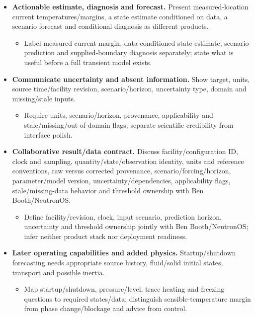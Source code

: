 \begin{itemize}[leftmargin=*]
\item {}\textbf{Actionable estimate, diagnosis and forecast.} Present measured-location current temperatures/\allowbreak{}margins, a state estimate conditioned on data, a scenario forecast and conditional diagnosis as different products.\cite{kapteyn2021digitaltwins}
\begin{itemize}
\item Label measured current margin, data-conditioned state estimate, scenario prediction and supplied-boundary diagnosis separately; state what is useful before a full transient model exists.
\end{itemize}
\item {}\textbf{Communicate uncertainty and absent information.} Show target, units, source time/\allowbreak{}facility revision, scenario/\allowbreak{}horizon, uncertainty type, domain and missing/\allowbreak{}stale inputs.\cite{kapteyn2021digitaltwins}
\begin{itemize}
\item Require units, scenario/\allowbreak{}horizon, provenance, applicability and stale/\allowbreak{}missing/\allowbreak{}out-of-domain flags; separate scientific credibility from interface polish.
\end{itemize}
\item {}\textbf{Collaborative result/\allowbreak{}data contract.} Discuss facility/\allowbreak{}configuration ID, clock and sampling, quantity/\allowbreak{}state/\allowbreak{}observation identity, units and reference conventions, raw versus corrected provenance, scenario/\allowbreak{}forcing/\allowbreak{}horizon, parameter/\allowbreak{}model version, uncertainty/\allowbreak{}dependencies, applicability flags, stale/\allowbreak{}missing-data behavior and threshold ownership with Ben Booth/\allowbreak{}NeutronOS.\cite{kapteyn2021digitaltwins}
\begin{itemize}
\item Define facility/\allowbreak{}revision, clock, input scenario, prediction horizon, uncertainty and threshold ownership jointly with Ben Booth/\allowbreak{}NeutronOS; infer neither product stack nor deployment readiness.
\end{itemize}
\item {}\textbf{Later operating capabilities and added physics.} Startup/\allowbreak{}shutdown forecasting needs appropriate source history, fluid/\allowbreak{}solid initial states, transport and possible inertia.
\begin{itemize}
\item Map startup/\allowbreak{}shutdown, pressure/\allowbreak{}level, trace heating and freezing questions to required states/\allowbreak{}data; distinguish sensible-temperature margin from phase change/\allowbreak{}blockage and advice from control.
\end{itemize}
\end{itemize}

